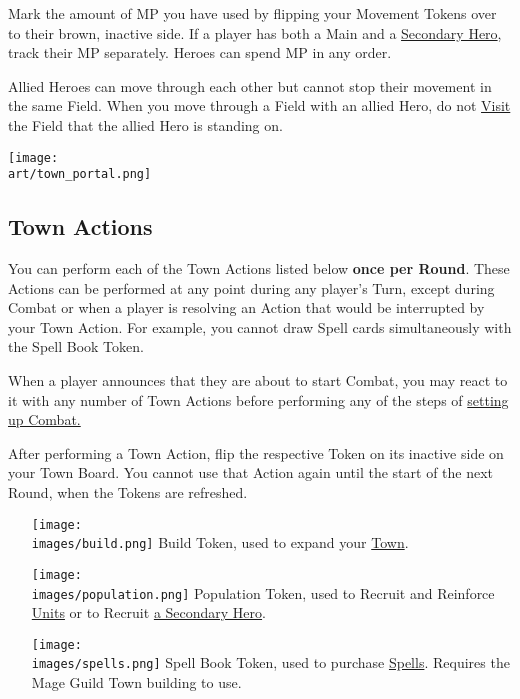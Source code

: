 \begin{multicols}{2}
\bigskip

Mark the amount of MP you have used by flipping your Movement Tokens over to their brown, inactive side.
If a player has both a Main and a \hyperlink{Secondary}{Secondary Hero}, track their MP separately.
Heroes can spend MP in any order.\par
Allied Heroes can move through each other but cannot stop their movement in the same Field.
When you move through a Field with an allied Hero, do not \hyperlink{Categories}{Visit} the Field that the allied Hero is standing on.\par


\vfill
\begin{center}
  \texttt{[image: \\art/town\_portal.png]}
\end{center}

\clearpage

\subsection*{Town Actions}
You can perform each of the Town Actions listed below \textbf{once per Round}.
These Actions can be performed at any point during any player's Turn, except during Combat or when a player is resolving an Action that would be interrupted by your Town Action.
For example, you cannot draw Spell cards simultaneously with the Spell Book Token.\par
When a player announces that they are about to start Combat, you may react to it with any number of Town Actions before performing any of the steps of \hyperlink{Combatsetup}{setting up Combat.}\par
After performing a Town Action, flip the respective Token on its inactive side on your Town Board.
You cannot use that Action again until the start of the next Round, when the Tokens are refreshed.
\begin{itemize}
  \item [{\texttt{[image: \\images/build.png]}}] Build Token, used to expand your \hyperlink{Town}{Town}.
  \item [{\texttt{[image: \\images/population.png]}}] Population Token, used to Recruit and Reinforce \hyperlink{Units}{Units} or to Recruit \hyperlink{Secondary}{a Secondary Hero}.
  \item [{\texttt{[image: \\images/spells.png]}}]Spell Book Token, used to purchase \hyperlink{spells}{Spells}. Requires the Mage Guild Town building to use.
\end{itemize}


\end{multicols}
